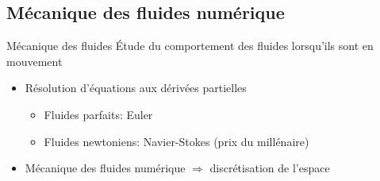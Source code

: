 \documentclass{beamer}
\begin{document}
\subsection{Mécanique des fluides numérique}
\begin{frame}
  \begin{block}{Mécanique des fluides}
    Étude du comportement des fluides lorsqu'ils sont en mouvement
  \end{block}
  
  \begin{itemize}
  \item Résolution d'équations aux dérivées partielles
    \begin{itemize}
    \item Fluides parfaits: Euler
    \item Fluides newtoniens: Navier-Stokes (prix du millénaire)
    \end{itemize}
  \item Mécanique des fluides numérique $\Rightarrow$ discrétisation de l'espace
  \end{itemize}

  \centering
  
\end{frame}
\end{document}
